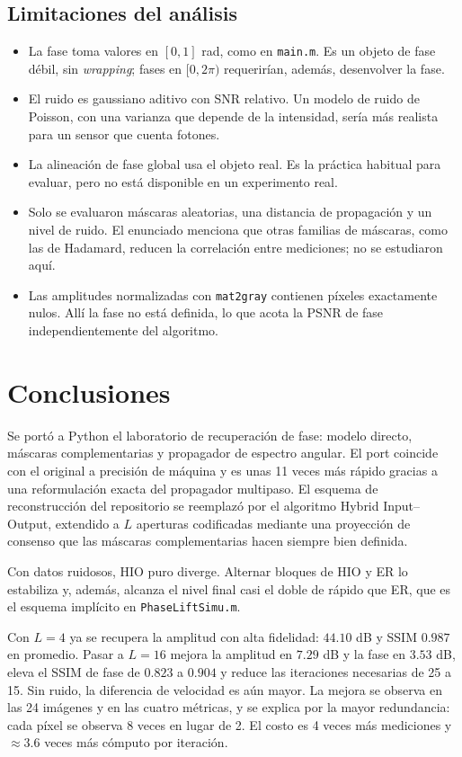 \documentclass[11pt,a4paper]{article}
\newcommand{\hio}{\textsc{HIO}}
\newcommand{\er}{\textsc{ER}}
\begin{document}
\subsection{Limitaciones del análisis}

\begin{itemize}
    \item La fase toma valores en $[0,1]$ rad, como en \texttt{main.m}. Es un objeto de fase débil, sin \emph{wrapping}; fases en $[0,2\pi)$ requerirían, además, desenvolver la fase.
    \item El ruido es gaussiano aditivo con SNR relativo. Un modelo de ruido de Poisson, con una varianza que depende de la intensidad, sería más realista para un sensor que cuenta fotones.
    \item La alineación de fase global usa el objeto real. Es la práctica habitual para evaluar, pero no está disponible en un experimento real.
    \item Solo se evaluaron máscaras aleatorias, una distancia de propagación y un nivel de ruido. El enunciado menciona que otras familias de máscaras, como las de Hadamard, reducen la correlación entre mediciones; no se estudiaron aquí.
    \item Las amplitudes normalizadas con \texttt{mat2gray} contienen píxeles exactamente nulos. Allí la fase no está definida, lo que acota la PSNR de fase independientemente del algoritmo.
\end{itemize}

\section{Conclusiones}

Se portó a Python el laboratorio de recuperación de fase: modelo directo, máscaras complementarias y propagador de espectro angular. El port coincide con el original a precisión de máquina y es unas 11 veces más rápido gracias a una reformulación exacta del propagador multipaso. El esquema de reconstrucción del repositorio se reemplazó por el algoritmo Hybrid Input--Output, extendido a $L$ aperturas codificadas mediante una proyección de consenso que las máscaras complementarias hacen siempre bien definida.

Con datos ruidosos, \hio{} puro diverge. Alternar bloques de \hio{} y \er{} lo estabiliza y, además, alcanza el nivel final casi el doble de rápido que \er{}, que es el esquema implícito en \texttt{PhaseLiftSimu.m}.

Con $L=4$ ya se recupera la amplitud con alta fidelidad: $44.10$ dB y SSIM $0.987$ en promedio. Pasar a $L=16$ mejora la amplitud en $7.29$ dB y la fase en $3.53$ dB, eleva el SSIM de fase de $0.823$ a $0.904$ y reduce las iteraciones necesarias de 25 a 15. Sin ruido, la diferencia de velocidad es aún mayor. La mejora se observa en las 24 imágenes y en las cuatro métricas, y se explica por la mayor redundancia: cada píxel se observa 8 veces en lugar de 2. El costo es 4 veces más mediciones y $\approx3.6$ veces más cómputo por iteración.
\end{document}
